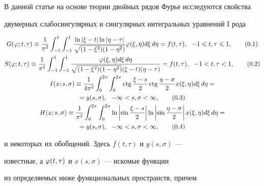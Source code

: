 В данной статье на основе теории двойных рядов Фурье исследуются свойства 


двумерных слабосингулярных и сингулярных интегральных уравнений I рода


\begin{gather}


G(\vp;t,\tau) \equiv \frac{1}{\pi^2}\int_{-1}^{1}\int_{-1}^{1}


\frac{\ln |\xi-t| \ln|\eta - \tau|}{\sqrt{(1-\xi^2)(1-\eta^2)}}


\vp(\xi,\eta)d\xi\,d\eta = f(t,\tau),


\ \ -1\lea t, \tau \lea 1, \tag{0.1} \\


%


S(\vp;t,\tau)\equiv \frac{1}{\pi^2}\int_{-1}^{1}\int_{-1}^{1}


\frac{\vp(\xi,\eta)d\xi\,d\eta}


{\sqrt{(1-\xi^2)(1-\eta^2)}(\xi-t)(\eta-\tau)}=f(t,\tau),\ \ -1<t,\tau<1,


\tag{0.2} \\


%


I(x;s,\sigma) \equiv \frac{1}{4\pi^2}\int_{0}^{2\pi}\int_{0}^{2\pi}


\ctg \frac{\xi-s}{2}\ctg\frac{\eta-\sigma}{2}x(\xi,\eta)d\xi\, d\eta=\notag\\


%


=y(s,\sigma),\ \ -\infty < s,\sigma<\infty,\tag{0.3}\\


%


H(x;s,\sigma) \equiv \frac{1}{\pi^2}\int_{0}^{2\pi}\int_{0}^{2\pi}


\ln \left|\sin \frac{\xi-s}{2}\right| \ln \left|\sin


\frac{\eta-\sigma}{2}\right|x(\xi,\eta)d\xi\,d\eta = \notag \\


%


=y(s,\sigma),\ \ -\infty<s,\sigma<\infty,\tag{0.4}


\end{gather}


и некоторых их обобщений. Здесь $f(t,\tau)$ и $y(s,\sigma)$ --- 


известные, а $\varphi(t,\tau)$ и $x(s,\sigma)$ --- искомые функции 


из определяемых ниже функциональных пространств, причем 


